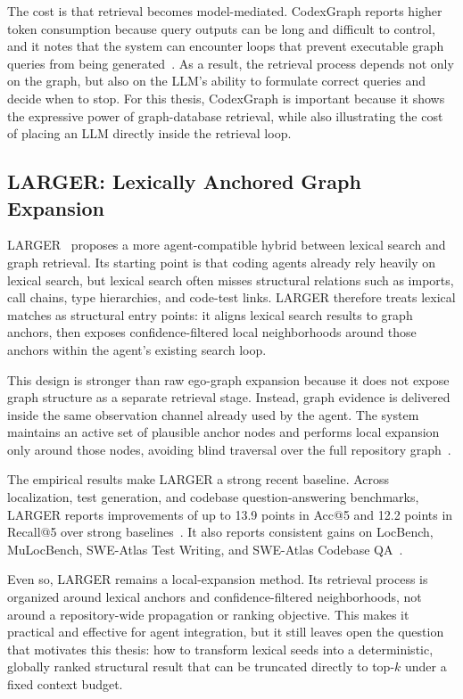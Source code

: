 The cost is that retrieval becomes model-mediated. CodexGraph reports higher token consumption because query outputs can be long and difficult to control, and it notes that the system can encounter loops that prevent executable graph queries from being generated~\cite{liu2024codexgraph}. As a result, the retrieval process depends not only on the graph, but also on the LLM's ability to formulate correct queries and decide when to stop. For this thesis, CodexGraph is important because it shows the expressive power of graph-database retrieval, while also illustrating the cost of placing an LLM directly inside the retrieval loop.

\subsection{LARGER: Lexically Anchored Graph Expansion}
\label{sec:larger}

LARGER~\cite{hu2026larger} proposes a more agent-compatible hybrid between lexical search and graph retrieval. Its starting point is that coding agents already rely heavily on lexical search, but lexical search often misses structural relations such as imports, call chains, type hierarchies, and code-test links. LARGER therefore treats lexical matches as structural entry points: it aligns lexical search results to graph anchors, then exposes confidence-filtered local neighborhoods around those anchors within the agent's existing search loop.

This design is stronger than raw ego-graph expansion because it does not expose graph structure as a separate retrieval stage. Instead, graph evidence is delivered inside the same observation channel already used by the agent. The system maintains an active set of plausible anchor nodes and performs local expansion only around those nodes, avoiding blind traversal over the full repository graph~\cite{hu2026larger}.

The empirical results make LARGER a strong recent baseline. Across localization, test generation, and codebase question-answering benchmarks, LARGER reports improvements of up to 13.9 points in Acc@5 and 12.2 points in Recall@5 over strong baselines~\cite{hu2026larger}. It also reports consistent gains on LocBench, MuLocBench, SWE-Atlas Test Writing, and SWE-Atlas Codebase QA~\cite{hu2026larger}.

Even so, LARGER remains a local-expansion method. Its retrieval process is organized around lexical anchors and confidence-filtered neighborhoods, not around a repository-wide propagation or ranking objective. This makes it practical and effective for agent integration, but it still leaves open the question that motivates this thesis: how to transform lexical seeds into a deterministic, globally ranked structural result that can be truncated directly to top-$k$ under a fixed context budget.

